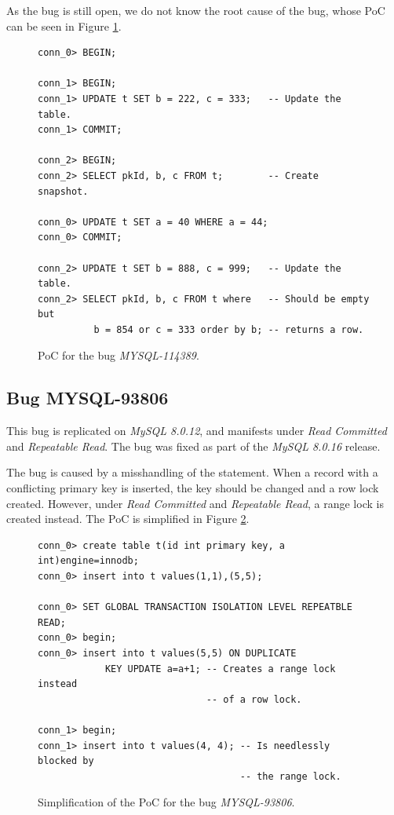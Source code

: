 As the bug is still open, we do not know the root cause of the bug, whose PoC can be seen in Figure \ref{fig:MYSQL-114389}.

\begin{figure}
\begin{verbatim}
conn_0> BEGIN;

conn_1> BEGIN;                          
conn_1> UPDATE t SET b = 222, c = 333;   -- Update the table.
conn_1> COMMIT;                         

conn_2> BEGIN;
conn_2> SELECT pkId, b, c FROM t;        -- Create snapshot.

conn_0> UPDATE t SET a = 40 WHERE a = 44;
conn_0> COMMIT;

conn_2> UPDATE t SET b = 888, c = 999;   -- Update the table.
conn_2> SELECT pkId, b, c FROM t where   -- Should be empty but
          b = 854 or c = 333 order by b; -- returns a row.

\end{verbatim}
\caption{PoC for the bug \textit{MYSQL-114389}.} \label{fig:MYSQL-114389}
\end{figure}


\subsection*{Bug MYSQL-93806}

This bug is replicated on \textit{MySQL 8.0.12}, and manifests under \textit{Read Committed} and \textit{Repeatable Read}. The bug was fixed as part of the \textit{MySQL 8.0.16} release.

The bug is caused by a misshandling of the  statement. When a record with a conflicting primary key is inserted, the key should be changed and a row lock created. However, under \textit{Read Committed} and \textit{Repeatable Read}, a range lock is created instead. The PoC is simplified in Figure \ref{fig:MYSQL-93806}.

\begin{figure}
\begin{verbatim}
conn_0> create table t(id int primary key, a int)engine=innodb;
conn_0> insert into t values(1,1),(5,5);

conn_0> SET GLOBAL TRANSACTION ISOLATION LEVEL REPEATBLE READ;
conn_0> begin;
conn_0> insert into t values(5,5) ON DUPLICATE
            KEY UPDATE a=a+1; -- Creates a range lock instead
                              -- of a row lock.

conn_1> begin;
conn_1> insert into t values(4, 4); -- Is needlessly blocked by
                                    -- the range lock.
\end{verbatim}
\caption{Simplification of the PoC for the bug \textit{MYSQL-93806}.} \label{fig:MYSQL-93806}
\end{figure}


